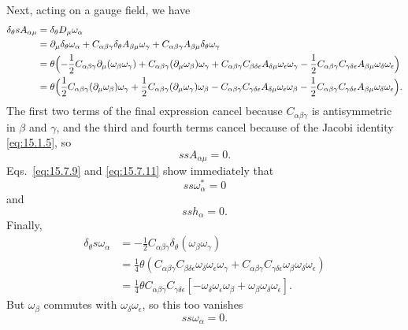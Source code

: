 Next, acting on a gauge field, we have
\begin{align*}
 \delta_\theta sA_{\alpha\mu}
 &=\delta_\theta D_\mu\omega_\alpha\\
 &=\partial_\mu\delta_\theta\omega_\alpha
 +C_{\alpha\beta\gamma}\delta_\theta A_{\beta\mu}\omega_\gamma
 +C_{\alpha\beta\gamma}A_{\beta\mu}\delta_\theta\omega_\gamma\\
 &=\theta\Bigl(-\frac{1}{2}C_{\alpha\beta\gamma}\partial_\mu(\omega_\beta\omega_\gamma)
 +C_{\alpha\beta\gamma}(\partial_\mu\omega_\beta)\omega_\gamma
 +C_{\alpha\beta\gamma}C_{\beta\delta\epsilon}A_{\delta\mu}\omega_\epsilon\omega_\gamma
 -\frac{1}{2}C_{\alpha\beta\gamma}C_{\gamma\delta\epsilon}A_{\beta\mu}\omega_\delta\omega_\epsilon\Bigr)\\
 &=\theta\Bigl(\frac{1}{2}C_{\alpha\beta\gamma}(\partial_\mu\omega_\beta)\omega_\gamma
 +\frac{1}{2}C_{\alpha\beta\gamma}(\partial_\mu\omega_\gamma)\omega_\beta
 -C_{\alpha\beta\gamma}C_{\gamma\delta\epsilon}A_{\delta\mu}\omega_\epsilon\omega_\beta
 -\frac{1}{2}C_{\alpha\beta\gamma}C_{\gamma\delta\epsilon}A_{\beta\mu}\omega_\delta\omega_\epsilon\Bigr).
\end{align*}
The first two terms of the final expression cancel because $C_{\alpha\beta\gamma}$ is antisymmetric in $\beta$ and $\gamma$, and the third and fourth terms cancel because of the Jacobi identity \eqref{eq:15.1.5}, so
\begin{equation}
 ssA_{\alpha\mu}=0.
 \tag{15.7.16}\label{eq:15.7.16}
\end{equation}
Eqs.~\eqref{eq:15.7.9} and \eqref{eq:15.7.11} show immediately that
\begin{equation}
 ss\omega_\alpha^*=0
 \tag{15.7.17}\label{eq:15.7.17}
\end{equation}
and
\begin{equation}
 ssh_\alpha=0.
 \tag{15.7.18}\label{eq:15.7.18}
\end{equation}
Finally,
\begin{align*}
 \delta_\theta s\omega_\alpha
 &=-\frac{1}{2}C_{\alpha\beta\gamma}\delta_\theta(\omega_\beta\omega_\gamma)\\
 &=\frac{1}{4}\theta\left(C_{\alpha\beta\gamma}C_{\beta\delta\epsilon}\omega_\delta\omega_\epsilon\omega_\gamma
 +C_{\alpha\beta\gamma}C_{\gamma\delta\epsilon}\omega_\beta\omega_\delta\omega_\epsilon\right)\\
 &=\frac{1}{4}\theta C_{\alpha\beta\gamma}C_{\gamma\delta\epsilon}
 \left[-\omega_\delta\omega_\epsilon\omega_\beta+\omega_\beta\omega_\delta\omega_\epsilon\right].
\end{align*}
But $\omega_\beta$ commutes with $\omega_\delta\omega_\epsilon$, so this too vanishes
\begin{equation}
 ss\omega_\alpha=0.
 \tag{15.7.19}\label{eq:15.7.19}
\end{equation}

